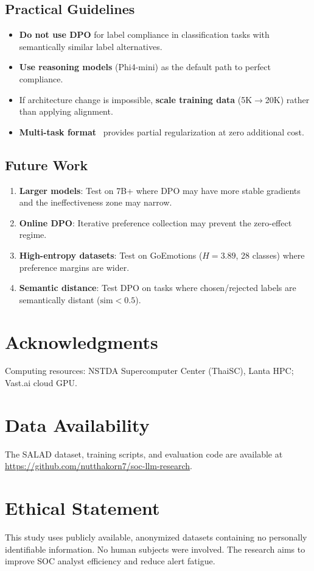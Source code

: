 \documentclass[journal]{IEEEtran}
\begin{document}
\subsection{Practical Guidelines}
\begin{itemize}
\item \textbf{Do not use DPO} for label compliance in classification tasks with semantically similar label alternatives.
\item \textbf{Use reasoning models} (Phi4-mini) as the default path to perfect compliance.
\item If architecture change is impossible, \textbf{scale training data} (5K$\to$20K) rather than applying alignment.
\item \textbf{Multi-task format}~\cite{p15} provides partial regularization at zero additional cost.
\end{itemize}

\subsection{Future Work}
\begin{enumerate}
\item \textbf{Larger models}: Test on 7B+ where DPO may have more stable gradients and the ineffectiveness zone may narrow.
\item \textbf{Online DPO}: Iterative preference collection may prevent the zero-effect regime.
\item \textbf{High-entropy datasets}: Test on GoEmotions ($H = 3.89$, 28 classes) where preference margins are wider.
\item \textbf{Semantic distance}: Test DPO on tasks where chosen/rejected labels are semantically distant ($\text{sim} < 0.5$).
\end{enumerate}

\section*{Acknowledgments}
Computing resources: NSTDA Supercomputer Center (ThaiSC), Lanta HPC; Vast.ai cloud GPU.


\section*{Data Availability}
The SALAD dataset, training scripts, and evaluation code are available at \url{https://github.com/nutthakorn7/soc-llm-research}.

\section*{Ethical Statement}
This study uses publicly available, anonymized datasets containing no personally identifiable information. No human subjects were involved. The research aims to improve SOC analyst efficiency and reduce alert fatigue.
\end{document}
